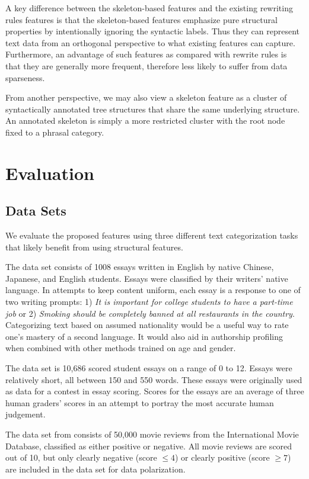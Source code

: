 \documentclass[conference]{IEEEtran}
\begin{document}
A key difference between the skeleton-based features and the existing rewriting
rules features is that the skeleton-based features emphasize pure structural
properties by intentionally ignoring the syntactic labels.  Thus they can
represent text data from an orthogonal perspective to what existing features can
capture. Furthermore, an advantage of such features as compared with rewrite
rules is that they are generally more frequent, therefore less likely to suffer
from data sparseness.

From another perspective, we may also view a skeleton feature as a cluster of
syntactically annotated tree structures that share the same underlying
structure. An annotated skeleton is simply a more restricted cluster with the
root node fixed to a phrasal category.

\section{Evaluation}

\subsection{Data Sets}

We evaluate the proposed features using three different text categorization
tasks that likely benefit from using structural features.

The \cite{ceeaus} data set consists of 1008 essays written in English by
native Chinese, Japanese, and English students. Essays were classified by their
writers' native language. In attempts to keep content uniform, each essay is a
response to one of two writing prompts: 1) \emph{It is important for college
students to have a part-time job} or 2) \emph{Smoking should be completely
banned at all restaurants in the country}. Categorizing text based on assumed
nationality would be a useful way to rate one's mastery of a second language. It
would also aid in authorship profiling when combined with other methods trained
on age and gender.

The \cite{kaggle-essay} data set is 10,686 scored student essays on a range
of 0 to 12. Essays were relatively short, all between 150 and 550 words. These
essays were originally used as data for a contest in essay scoring. Scores for
the essays are an average of three human graders' scores in an attempt to
portray the most accurate human judgement.

The data set from \cite{acl-maas-2011} consists of 50,000 movie reviews from
the International Movie Database, classified as either positive or negative. All
movie reviews are scored out of 10, but only clearly negative (score $\leq 4$)
or clearly positive (score $\geq 7$) are included in the data set for
data polarization.
\end{document}
